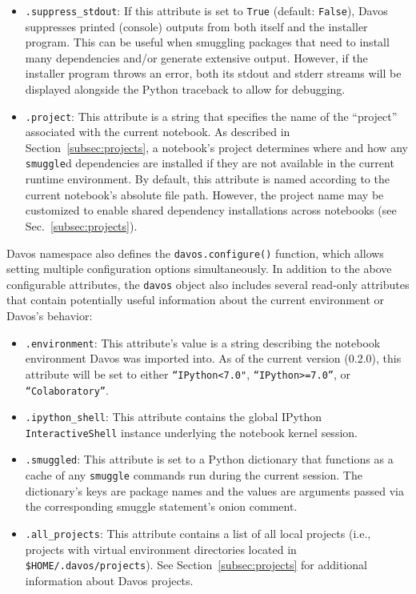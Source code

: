 \documentclass[preprint,12pt,a4paper]{elsarticle}
\begin{document}
\begin{itemize}
\item \texttt{.suppress\_stdout}: If this attribute is set to
  \texttt{True} (default: \texttt{False}), Davos suppresses
  printed (console) outputs from both itself and the installer program.
  This can be useful when smuggling packages that need to install many
  dependencies and/or generate extensive output. However, if the installer
  program throws an error, both its stdout and stderr streams will be
  displayed alongside the Python traceback to allow for debugging.

\item \texttt{.project}: This attribute is a string that specifies the name of
the ``project'' associated with the current notebook. As described in
Section~\ref{subsec:projects}, a notebook's project determines where and how
any \texttt{smuggle}d dependencies are installed if they are not available in
the current runtime environment. By default, this attribute is named according
to the current notebook's absolute file path. However, the project name may be
customized to enable shared dependency installations across notebooks (see
Sec.~\ref{subsec:projects}).

\end{itemize}

\noindent Davos namespace also defines the \texttt{davos.configure()} function,
which allows setting multiple configuration options simultaneously. In addition
to the above configurable attributes, the \texttt{davos} object also includes
several read-only attributes that contain potentially useful information about
the current environment or Davos's behavior:

\begin{itemize}

\item \texttt{.environment}: This attribute's value is a string describing the notebook
environment Davos was imported into. As of the current version (0.2.0), this
attribute will be set to either \texttt{“IPython<7.0"}, \texttt{“IPython>=7.0”}, or \texttt{“Colaboratory”}.

  \item \texttt{.ipython\_shell}: This attribute contains the global IPython \texttt{InteractiveShell} instance underlying the notebook kernel session.

  \item \texttt{.smuggled}: This attribute is set to a Python dictionary that functions as a cache of any \texttt{smuggle} commands run during the current
session.  The dictionary's keys are package names and the values are arguments passed via the corresponding smuggle statement's onion comment.

  \item \texttt{.all\_projects}: This attribute contains a list of all local projects (i.e., projects with virtual environment directories located in \texttt{\$HOME/.davos/projects}).  See Section~\ref{subsec:projects} for additional information about Davos projects.

\end{itemize}
\end{document}

